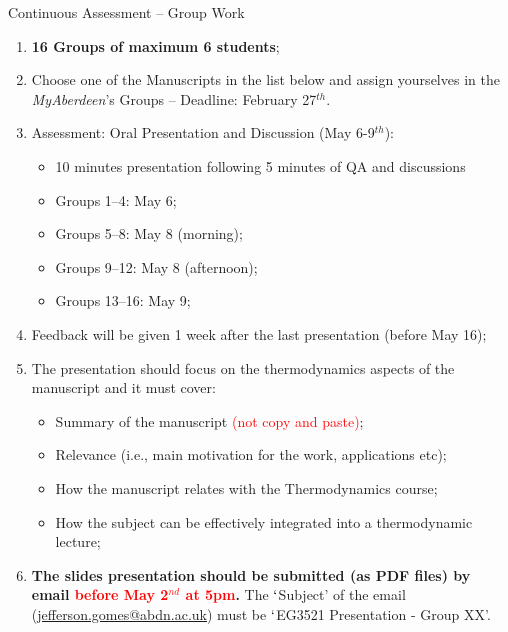\documentclass[12pts,a4paper]{report}%
\begin{document}
\begin{center}
{\Large Continuous Assessment -- Group Work}
\end{center}

\begin{enumerate}
%
\item {\bf 16 Groups of maximum 6 students};
%
\item Choose one of the Manuscripts in the list below and assign yourselves in the {\it MyAberdeen}'s Groups -- Deadline: February 27$^{th}$.
%
\item Assessment: Oral Presentation and Discussion (May 6-9$^{th}$):
  \begin{itemize}
   \item 10 minutes presentation following 5 minutes of QA and discussions
   \item Groups 1--4: May 6; 
   \item Groups 5--8: May 8 (morning);
   \item Groups 9--12: May 8 (afternoon);
   \item Groups 13--16: May 9;
  \end{itemize}
 \item Feedback will be given 1 week after the last presentation (before May 16);
 \item The presentation should focus on the thermodynamics aspects of the manuscript and it must cover:
 \begin{itemize}
   \item Summary of the manuscript \textcolor{red}{(not copy and paste)};
   \item Relevance (i.e., main motivation for the work, applications etc);
   \item How the manuscript relates with the Thermodynamics course;
   \item How the subject can be effectively integrated into a thermodynamic lecture;
\end{itemize}
\item {\bf The slides presentation should be submitted (as PDF files) by email \textcolor{red}{before May 2$^{nd}$ at 5pm}.}  The $\lq$Subject' of the email (\href{mailto:jefferson.gomes@abdn.ac.uk}{jefferson.gomes@abdn.ac.uk}) must be $\lq$EG3521 Presentation - Group XX'.
\end{enumerate}
%
\end{document}
